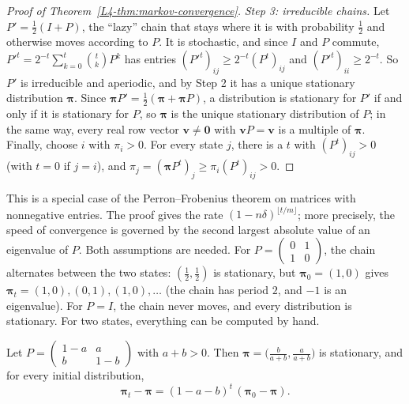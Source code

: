 \begin{proof}[Proof of Theorem~\ref{L4-thm:markov-convergence}]
    \emph{Step 3: irreducible chains.} Let $P' = \frac{1}{2}(I + P)$, the ``lazy'' chain that stays where it is with probability $\frac{1}{2}$ and otherwise moves according to $P$. It is stochastic, and since $I$ and $P$ commute, $P'^t = 2^{-t}\sum_{k=0}^t \binom{t}{k}P^k$ has entries $(P'^t)_{ij} \geq 2^{-t}(P^t)_{ij}$ and $(P'^t)_{ii} \geq 2^{-t}$. So $P'$ is irreducible and aperiodic, and by Step 2 it has a unique stationary distribution $\boldsymbol{\pi}$. Since $\boldsymbol{\pi}P' = \frac{1}{2}(\boldsymbol{\pi} + \boldsymbol{\pi}P)$, a distribution is stationary for $P'$ if and only if it is stationary for $P$, so $\boldsymbol{\pi}$ is the unique stationary distribution of $P$; in the same way, every real row vector $\mathbf{v} \neq \mathbf{0}$ with $\mathbf{v}P = \mathbf{v}$ is a multiple of $\boldsymbol{\pi}$. Finally, choose $i$ with $\pi_i > 0$. For every state $j$, there is a $t$ with $(P^t)_{ij} > 0$ (with $t = 0$ if $j = i$), and $\pi_j = (\boldsymbol{\pi}P^t)_j \geq \pi_i(P^t)_{ij} > 0$.
\end{proof}

This is a special case of the Perron--Frobenius theorem on matrices with nonnegative entries. The proof gives the rate $(1 - n\delta)^{\lfloor t/m \rfloor}$; more precisely, the speed of convergence is governed by the second largest absolute value of an eigenvalue of $P$. Both assumptions are needed. For $P = \left(\begin{smallmatrix} 0 & 1 \\ 1 & 0 \end{smallmatrix}\right)$, the chain alternates between the two states: $(\frac{1}{2}, \frac{1}{2})$ is stationary, but $\boldsymbol{\pi}_0 = (1, 0)$ gives $\boldsymbol{\pi}_t = (1, 0), (0, 1), (1, 0), \ldots$ (the chain has period $2$, and $-1$ is an eigenvalue). For $P = I$, the chain never moves, and every distribution is stationary. For two states, everything can be computed by hand.

\begin{proposition}\label{L4-prop:two-state}
    Let $P = \begin{pmatrix} 1 - a & a \\ b & 1 - b \end{pmatrix}$ with $a + b > 0$. Then $\boldsymbol{\pi} = \big(\frac{b}{a + b}, \frac{a}{a + b}\big)$ is stationary, and for every initial distribution,
    \[\boldsymbol{\pi}_t - \boldsymbol{\pi} = (1 - a - b)^t\,(\boldsymbol{\pi}_0 - \boldsymbol{\pi}).\]
\end{proposition}

